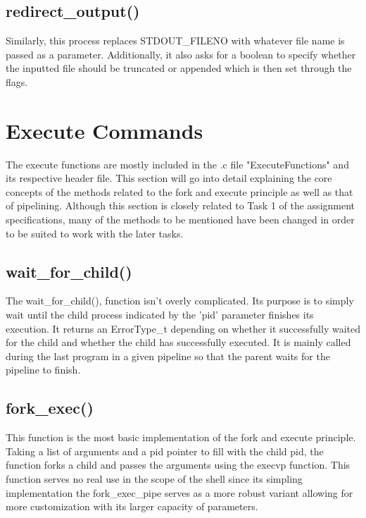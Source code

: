 \documentclass[12pt, a4paper]{report}
\begin{document}
\section{redirect\_output()}
Similarly, this process replaces STDOUT\_FILENO with whatever file name is passed as a parameter. Additionally, it also asks for a boolean to specify whether the inputted file should be truncated or appended which is then set through the flags. 


\chapter{Execute Commands}
The execute functions are mostly included in the .c file "ExecuteFunctions" and its respective header file. This section will go into detail explaining the core concepts of the methods related to the fork and execute principle as well as that of pipelining. Although this section is closely related to Task 1 of the assignment specifications, many of the methods to be mentioned have been changed in order to be suited to work with the later tasks.

\section{wait\_for\_child()}
The wait\_for\_child(), function isn't overly complicated. Its purpose is to simply wait until the child process indicated by the 'pid' parameter finishes its execution. It returns an ErrorType\_t depending on whether it successfully waited for the child and whether the child has successfully executed. It is mainly called during the last program in a given pipeline so that the parent waits for the pipeline to finish.

\section{fork\_exec()}
This function is the most basic implementation of the fork and execute principle. Taking a list of arguments and a pid pointer to fill with the child pid, the function forks a child and passes the arguments using the execvp function. This function serves no real use in the scope of the shell since its simpling implementation the fork\_exec\_pipe serves as a more robust variant allowing for more customization with its larger capacity of parameters.
\end{document}
